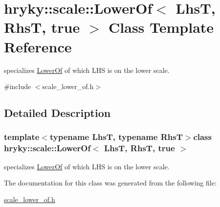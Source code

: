 \hypertarget{classhryky_1_1scale_1_1_lower_of_3_01_lhs_t_00_01_rhs_t_00_01true_01_4}{\section{hryky\-:\-:scale\-:\-:Lower\-Of$<$ Lhs\-T, Rhs\-T, true $>$ Class Template Reference}
\label{classhryky_1_1scale_1_1_lower_of_3_01_lhs_t_00_01_rhs_t_00_01true_01_4}
}


specializes \hyperlink{classhryky_1_1scale_1_1_lower_of}{Lower\-Of} of which L\-H\-S is on the lower scale.  




{\ttfamily \#include $<$scale\-\_\-lower\-\_\-of.\-h$>$}



\subsection{Detailed Description}
\subsubsection*{template$<$typename Lhs\-T, typename Rhs\-T$>$class hryky\-::scale\-::\-Lower\-Of$<$ Lhs\-T, Rhs\-T, true $>$}

specializes \hyperlink{classhryky_1_1scale_1_1_lower_of}{Lower\-Of} of which L\-H\-S is on the lower scale. 

The documentation for this class was generated from the following file\-:\begin{DoxyCompactItemize}
\item 
\hyperlink{scale__lower__of_8h}{scale\-\_\-lower\-\_\-of.\-h}\end{DoxyCompactItemize}
